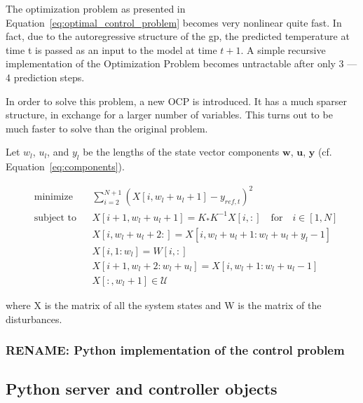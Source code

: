 The optimization problem as presented in
Equation~\ref{eq:optimal_control_problem} becomes very nonlinear quite fast. In
fact, due to the autoregressive structure of the \acrshort{gp}, the predicted
temperature at time t is passed as an input to the model at time $t+1$. A simple
recursive implementation of the Optimization Problem becomes untractable after
only 3 --- 4 prediction steps. 

In order to solve this problem, a new OCP is introduced. It has a much sparser
structure, in exchange for a larger number of variables. This turns out to be
much faster to solve than the original problem.

Let $w_l$, $u_l$, and $y_l$ be the lengths of the state vector components
$\mathbf{w}$, $\mathbf{u}$, $\mathbf{y}$ (cf. Equation~\ref{eq:components}).

\begin{subequations}\label{eq:sparse_optimal_control_problem}
    \begin{align}
        & \text{minimize}
        & & \sum_{i=2}^{N + 1} \left(X[i, w_l + u_l + 1] - y_{ref, t}\right)^2 \\
        & \text{subject to}
        & & X[i+1, w_l + u_l + 1] = K_*K^{-1}X[i, :] \quad \text{for} \quad
        i\in[1, N]\\
        &&& X[i, w_l + u_l + 2: ] = X[i, w_l+ u_l + 1: w_l + u_l + y_l - 1]\\
        &&& X[i, 1:w_l] = W[i, :] \\
        &&& X[i+1, w_l + 2: w_l + u_l] = X[i, w_l + 1: w_l + u_l - 1] \\
        &&& X[:, w_l + 1] \in \mathcal{U}
    \end{align}
\end{subequations}

where X is the matrix of all the system states and W is the matrix of the
disturbances.

\subsubsection{RENAME: Python implementation of the control problem}


\subsection{Python server and controller objects}


\clearpage
